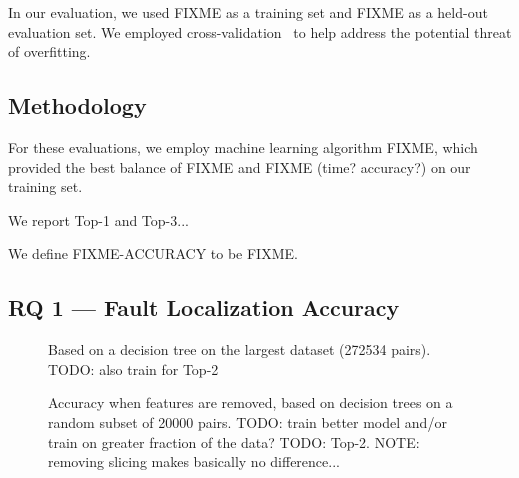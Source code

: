 \documentclass[conference]{IEEEtran}
\begin{document}
In our evaluation, we used FIXME as a training set and FIXME as a held-out
evaluation set. We employed cross-validation~\cite{kohavi} to help address
the potential threat of overfitting.

\subsection{Methodology}

For these evaluations, we employ machine learning algorithm FIXME, which
provided the best balance of FIXME and FIXME (time? accuracy?) on our
training set.

We report Top-1 and Top-3...

We define FIXME-ACCURACY to be FIXME.

\subsection{RQ 1 --- Fault Localization Accuracy}

\begin{figure}
\caption{Based on a decision tree on the largest
dataset (272534 pairs). TODO: also train for Top-2}
\label{fig:full-dataset-acc}
\end{figure}

\begin{figure}
\caption{Accuracy when features are removed, based on decision trees on a random subset of 20000 pairs.
TODO: train better model and/or
train on greater fraction of the data? TODO: Top-2. NOTE: removing slicing makes basically no difference...}
\label{fig:removing-features}
\end{figure}
\end{document}
